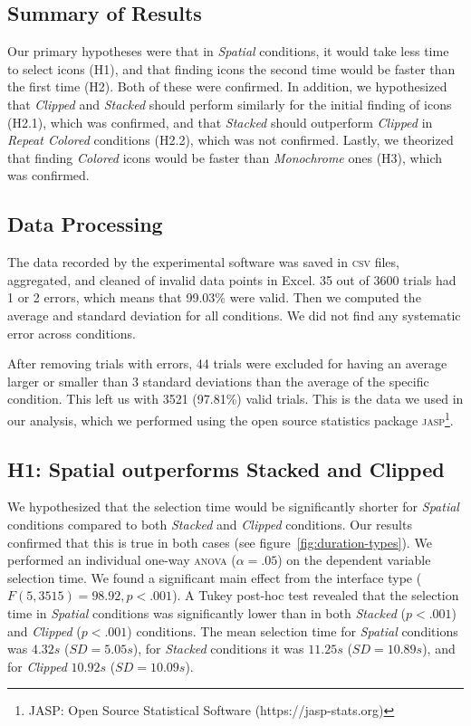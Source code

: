 \documentclass[nobib]{tufte-book} %
\begin{document}
\subsection{Summary of Results}
Our primary hypotheses were that in \emph{Spatial} conditions, it would take less time to select icons (H1), and that finding icons the second time would be faster than the first time (H2). Both of these were confirmed. In addition, we hypothesized that \emph{Clipped} and \emph{Stacked} should perform similarly for the initial finding of icons (H2.1), which was confirmed, and that \emph{Stacked} should outperform \emph{Clipped} in \emph{Repeat Colored} conditions (H2.2), which was not confirmed.
Lastly, we theorized that finding \emph{Colored} icons would be faster than \emph{Monochrome} ones (H3), which was confirmed.

\subsection{Data Processing}
The data recorded by the experimental software was saved in \textsc{csv} files, aggregated, and cleaned of invalid data points in Excel. 35 out of 3600 trials had 1 or 2 errors, which means that 99.03\% were valid. Then we computed the average and standard deviation for all conditions. We did not find any systematic error across conditions.

After removing trials with errors, 44 trials were excluded for having an average larger or smaller than 3 standard deviations than the average of the specific condition. This left us with 3521 (97.81\%) valid trials. This is the data we used in our analysis, which we performed using the open source statistics package \textsc{jasp}\footnote{JASP: Open Source Statistical Software (https://jasp-stats.org)}.

\subsection{H1: Spatial outperforms Stacked and Clipped}
We hypothesized that the selection time would be significantly shorter for \emph{Spatial} conditions compared to both \emph{Stacked} and \emph{Clipped} conditions. Our results confirmed that this is true in both cases (see figure~\ref{fig:duration-types}). We performed an individual one-way \textsc{anova} ($\alpha = .05$) on the dependent variable selection time. We found a significant main effect from the interface type ($F(5,3515) = 98.92, p < .001$).
A Tukey post-hoc test revealed that the selection time in \emph{Spatial} conditions was significantly lower than in both \emph{Stacked} ($p < .001$) and \emph{Clipped} ($p < .001$) conditions. The mean selection time for \emph{Spatial} conditions was $4.32 s$ ($SD = 5.05 s$), for \emph{Stacked} conditions it was $11.25 s$ ($SD = 10.89 s$), and for \emph{Clipped} $10.92 s$ ($SD = 10.09 s$).
\end{document}
